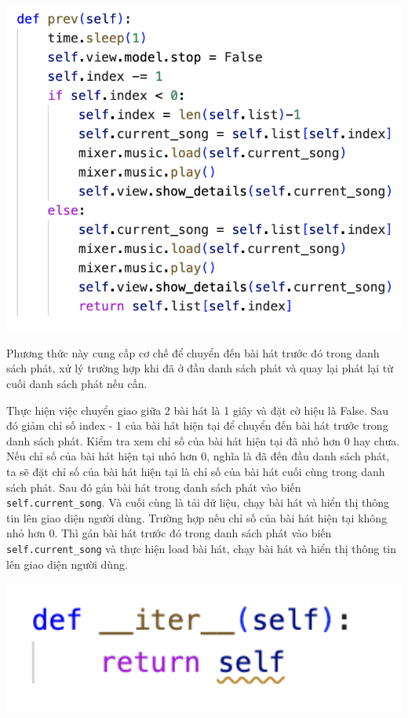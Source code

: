 \documentclass[a4paper]{article}
\begin{document}
\begin{center}
\includegraphics[width=175mm]{template_SGU 2/PlayList_prev.png}
\end{center}

\hspace*{0.5cm} Phương thức này cung cấp cơ chế để chuyển đến bài hát trước đó trong danh sách phát, xử lý trường hợp khi đã ở đầu danh sách phát và quay lại phát lại từ cuối danh sách phát nếu cần.

\hspace*{0.5cm} Thực hiện việc chuyển giao giữa 2 bài hát là 1 giây và đặt cờ hiệu là False. Sau đó giảm chỉ số index - 1  của bài hát hiện tại để chuyển đến bài hát trước trong danh sách phát. Kiểm tra xem chỉ số của bài hát hiện tại đã nhỏ hơn 0 hay chưa. Nếu chỉ số của bài hát hiện tại nhỏ hơn 0, nghĩa là đã đến đầu danh sách phát, ta sẽ đặt chỉ số của bài hát hiện tại là chỉ số của bài hát cuối cùng trong danh sách phát. Sau đó gán bài hát trong danh sách phát vào biến \texttt{self.current\_song}. Và cuối cùng là tải dữ liệu, chạy bài hát và hiển thị thông tin lên giao diện người dùng. Trường hợp nếu chỉ số của bài hát hiện tại không nhỏ hơn 0. Thì gán bài hát trước đó trong danh sách phát vào biến \texttt{self.current\_song} và thực hiện load bài hát, chạy bài hát và hiển thị thông tin lên giao diện người dùng.

\begin{center}
\includegraphics[width=175mm]{template_SGU 2/PlayList_iter.png}
\end{center}
\end{document}
